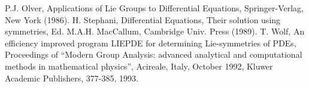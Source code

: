 \documentclass[12pt]{article}
\begin{document}
\begin{thebibliography}{99}
 P.J. Olver, Applications of Lie Groups to Differential
      Equations, Springer-Verlag, New York (1986).
 H. Stephani, Differential Equations, Their solution using
      symmetries, Ed. M.A.H. MacCallum, Cambridge Univ. Press (1989).
 T. Wolf, An efficiency improved program LIEPDE for 
          determining Lie-symmetries
          of PDEs, Proceedings of ``Modern Group Analysis: advanced analytical 
          and computational methods in mathematical physics'', Acireale, Italy,
          October 1992, Kluwer Academic Publishers, 377-385, 1993.
\end{thebibliography}
\end{document}
